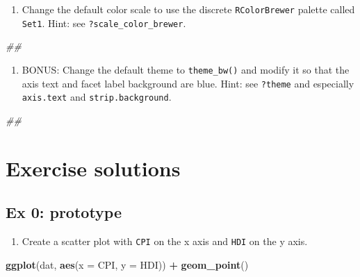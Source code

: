 \documentclass[
]{book}
\newenvironment{Shaded}{\begin{snugshade}}{\end{snugshade}}
\newcommand{\CommentTok}[1]{\textcolor[rgb]{0.56,0.35,0.01}{\textit{#1}}}
\newcommand{\DataTypeTok}[1]{\textcolor[rgb]{0.13,0.29,0.53}{#1}}
\newcommand{\KeywordTok}[1]{\textcolor[rgb]{0.13,0.29,0.53}{\textbf{#1}}}
\newcommand{\NormalTok}[1]{#1}
\newcommand{\OperatorTok}[1]{\textcolor[rgb]{0.81,0.36,0.00}{\textbf{#1}}}
\newcommand{\StringTok}[1]{\textcolor[rgb]{0.31,0.60,0.02}{#1}}
\providecommand{\tightlist}{%
  \setlength{\itemsep}{0pt}\setlength{\parskip}{0pt}}
\begin{document}
\begin{enumerate}
\def\labelenumi{\arabic{enumi}.}
\setcounter{enumi}{4}
\tightlist
\item
  Change the default color scale to use the discrete \texttt{RColorBrewer} palette called \texttt{Set1}. Hint: see \texttt{?scale\_color\_brewer}.
\end{enumerate}

\begin{Shaded}
\begin{Highlighting}[]
\CommentTok{## }
\end{Highlighting}
\end{Shaded}

\begin{enumerate}
\def\labelenumi{\arabic{enumi}.}
\setcounter{enumi}{5}
\tightlist
\item
  BONUS: Change the default theme to \texttt{theme\_bw()} and modify it so that the axis text and facet label background are blue. Hint: see \texttt{?theme} and especially \texttt{axis.text} and \texttt{strip.background}.
\end{enumerate}

\begin{Shaded}
\begin{Highlighting}[]
\CommentTok{## }
\end{Highlighting}
\end{Shaded}

\hypertarget{exercise-solutions-2}{%
\section{Exercise solutions}\label{exercise-solutions-2}}

\hypertarget{ex-0-prototype-2}{%
\subsection{Ex 0: prototype}\label{ex-0-prototype-2}}

\begin{enumerate}
\def\labelenumi{\arabic{enumi}.}
\tightlist
\item
  Create a scatter plot with \texttt{CPI} on the x axis and \texttt{HDI} on the y axis.
\end{enumerate}

\begin{Shaded}
\begin{Highlighting}[]
\KeywordTok{ggplot}\NormalTok{(dat, }\KeywordTok{aes}\NormalTok{(}\DataTypeTok{x =}\NormalTok{ CPI, }\DataTypeTok{y =}\NormalTok{ HDI)) }\OperatorTok{+}
\StringTok{  }\KeywordTok{geom_point}\NormalTok{()}
\end{Highlighting}
\end{Shaded}
\end{document}

